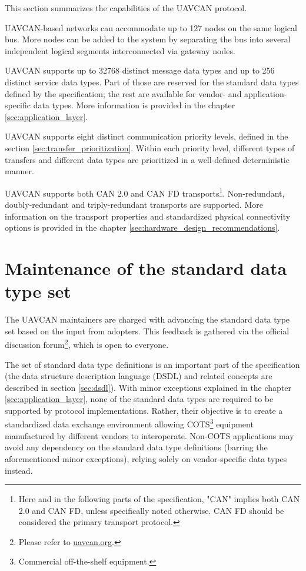 This section summarizes the capabilities of the UAVCAN protocol.

UAVCAN-based networks can accommodate up to 127 nodes on the same logical bus.
More nodes can be added to the system by separating the bus into several independent logical segments
interconnected via gateway nodes.

UAVCAN supports up to 32768 distinct message data types and up to 256 distinct service data types.
Part of those are reserved for the standard data types defined by the specification;
the rest are available for vendor- and application-specific data types.
More information is provided in the chapter \ref{sec:application_layer}.

UAVCAN supports eight distinct communication priority levels,
defined in the section \ref{sec:transfer_prioritization}.
Within each priority level, different types of transfers and different data types are
prioritized in a well-defined deterministic manner.

UAVCAN supports both CAN 2.0 and CAN FD
transports\footnote{Here and in the following parts of the specification,
"CAN" implies both CAN 2.0 and CAN FD, unless specifically noted otherwise.
CAN FD should be considered the primary transport protocol.}.
Non-redundant, doubly-redundant and triply-redundant transports are supported.
More information on the transport properties and standardized physical connectivity options
is provided in the chapter \ref{sec:hardware_design_recommendations}.

\section{Maintenance of the standard data type set}

The UAVCAN maintainers are charged with advancing the standard data type set based on the input from adopters.
This feedback is gathered via the official discussion
forum\footnote{Please refer to \href{http://uavcan.org}{uavcan.org}.},
which is open to everyone.

The set of standard data type definitions is an important part of the specification
(the data structure description language (DSDL) and related concepts are described in section \ref{sec:dsdl}).
With minor exceptions explained in the chapter \ref{sec:application_layer},
none of the standard data types are required to be supported by protocol implementations.
Rather, their objective is to create a standardized data exchange environment
allowing COTS\footnote{Commercial off-the-shelf equipment.} equipment manufactured by different vendors to
interoperate.
Non-COTS applications may avoid any dependency on the standard data type definitions (barring the aforementioned
minor exceptions), relying solely on vendor-specific data types instead.

